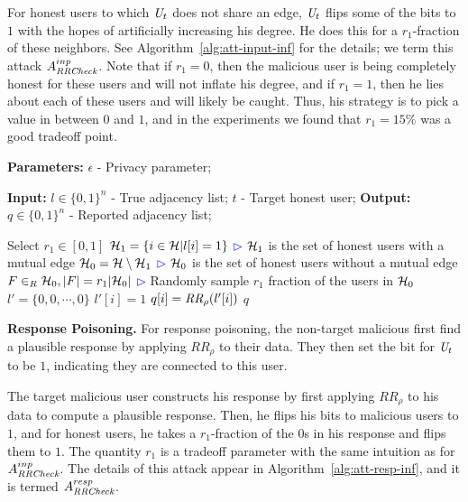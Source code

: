 For honest users to which $\textit{U}_t$ does not share an edge, $\textit{U}_t$ flips some of the bits to $1$ with the hopes of artificially increasing his degree. He does this for a $r_1$-fraction of these neighbors. See Algorithm~\ref{alg:att-input-inf} for the details; we term this attack $A_{\textit{RRCheck}}^{inp}$. Note that if $r_1 = 0$, then the malicious user is being completely honest for these users and will not inflate his degree, and if $r_1 = 1$, then he lies about each of these users and will likely be caught. Thus, his strategy is to pick a value in between $0$ and $1$, and in the experiments we found that $r_1 = 15\%$ was a good tradeoff point.

\begin{algorithm}[bt]
  \caption{$A_{\DegRRCheck}^{inp}: \{0,1\}^n\mapsto\{0,1\}^n$ }\label{alg:att-input-inf}
  \begin{algorithmic}[1]
  \Statex \textbf{Parameters:} $\epsilon$ - Privacy parameter;
  
  \Statex\textbf{Input:} $l \in \{0,1\}^n$ - True adjacency list;
  \Statex \hspace{0.9cm} $t$ - Target honest user;
  \Statex \textbf{Output:} $q \in \{0,1\}^n$ - Reported adjacency list;
  \vspace{0.2cm}

\State Select $r_1\in [0,1]$
\State $\mathcal{H}_1=\{i \in \mathcal{H}| l[i]=1\}$ 
\Statex \hfill\textcolor{blue}{$\rhd$} $\mathcal{H}_1$ is the set of honest users with a mutual edge
  \State $\mathcal{H}_0=\mathcal{H}\setminus\mathcal{H}_1$
  \Statex \hfill\textcolor{blue}{$\rhd$} $\mathcal{H}_0$ is the set of honest users without a mutual edge
    \State $F\in_R \mathcal{H}_0, |F|=r_1|\mathcal{H}_0|$
    \Statex \hfill\textcolor{blue}{$\rhd$} Randomly sample $r_1$ fraction of the users in $\mathcal{H}_0$ 
    \State $l'=\{0,0,\cdots, 0\}$
  \State $l'[i]=1$ 
  \EndFor
  \State $q[i]=\textit{RR}_\rho(l'[i])$
  \EndFor
  \Return $q$
  \end{algorithmic}
\end{algorithm}

\noindent \textbf{Response Poisoning.}  For response poisoning, the non-target malicious first find a plausible response by applying $RR_\rho$ to their data. They then set the bit for $\textit{U}_t$ to be $1$, indicating they are connected to this user.

The target malicious user constructs his response by first applying $RR_\rho$ to his data to compute a plausible response. Then, he flips his bits to malicious users to $1$, and for honest users, he takes a $r_1$-fraction of the $0$s in his response and flips them to $1$. The quantity $r_1$ is a tradeoff parameter with the same intuition as for $A_{\textit{RRCheck}}^{inp}$. The details of this attack appear in Algorithm~\ref{alg:att-resp-inf}, and it is termed $A_{\textit{RRCheck}}^{resp}$.

